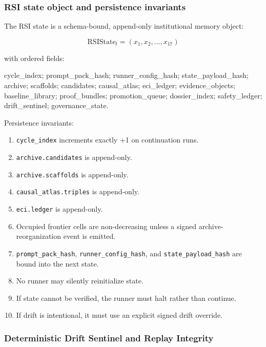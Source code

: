 \documentclass[
  11pt,
]{article}
\newenvironment{Shaded}{}{}
\newcommand{\NormalTok}[1]{#1}
\providecommand{\tightlist}{%
  \setlength{\itemsep}{0pt}\setlength{\parskip}{0pt}}
\begin{document}
\subsubsection{RSI state object and persistence
invariants}\label{rsi-state-object-and-persistence-invariants}

The RSI state is a schema-bound, append-only institutional memory
object:

\[
\mathrm{RSIState}_t = (x_1, x_2, \ldots, x_{17})
\]

with ordered fields:

\begin{Shaded}
\begin{Highlighting}[]
\NormalTok{cycle\_index; prompt\_pack\_hash; runner\_config\_hash; state\_payload\_hash;}
\NormalTok{archive; scaffolds; candidates; causal\_atlas; eci\_ledger; evidence\_objects;}
\NormalTok{baseline\_library; proof\_bundles; promotion\_queue; dossier\_index; safety\_ledger;}
\NormalTok{drift\_sentinel; governance\_state.}
\end{Highlighting}
\end{Shaded}

Persistence invariants:

\begin{enumerate}
\def\labelenumi{\arabic{enumi}.}
\tightlist
\item
  \texttt{cycle\_index} increments exactly +1 on continuation runs.
\item
  \texttt{archive.candidates} is append-only.
\item
  \texttt{archive.scaffolds} is append-only.
\item
  \texttt{causal\_atlas.triples} is append-only.
\item
  \texttt{eci.ledger} is append-only.
\item
  Occupied frontier cells are non-decreasing unless a signed
  archive-reorganization event is emitted.
\item
  \texttt{prompt\_pack\_hash}, \texttt{runner\_config\_hash}, and
  \texttt{state\_payload\_hash} are bound into the next state.
\item
  No runner may silently reinitialize state.
\item
  If state cannot be verified, the runner must halt rather than
  continue.
\item
  If drift is intentional, it must use an explicit signed drift
  override.
\end{enumerate}

\subsubsection{Deterministic Drift Sentinel and Replay
Integrity}\label{deterministic-drift-sentinel-and-replay-integrity}
\end{document}
